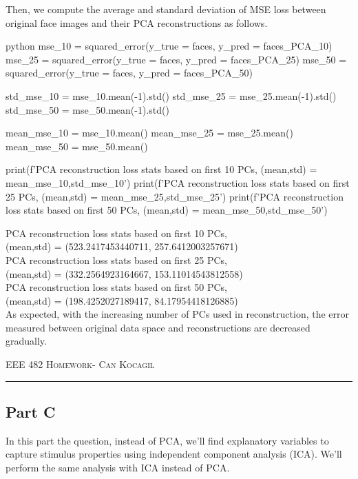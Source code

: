 \documentclass[12pt]{amsart}
\begin{document}
Then, we compute the average and standard deviation of  MSE loss between original face images and their PCA reconstructions as follows.

\begin{mintedbox}{python}
mse_10 = squared_error(y_true = faces, y_pred = faces_PCA_10)
mse_25 = squared_error(y_true = faces, y_pred = faces_PCA_25)
mse_50 = squared_error(y_true = faces, y_pred = faces_PCA_50)


std_mse_10 = mse_10.mean(-1).std()
std_mse_25 = mse_25.mean(-1).std()
std_mse_50 = mse_50.mean(-1).std()

mean_mse_10 = mse_10.mean()
mean_mse_25 = mse_25.mean()
mean_mse_50 = mse_50.mean()


print(f'PCA reconstruction loss stats based on first 10 PCs, \n (mean,std) = {mean_mse_10,std_mse_10}')
print(f'PCA reconstruction loss stats based on first 25 PCs, \n (mean,std) = {mean_mse_25,std_mse_25}')
print(f'PCA reconstruction loss stats based on first 50 PCs, \n (mean,std) = {mean_mse_50,std_mse_50}')
\end{mintedbox}

PCA reconstruction loss stats based on first 10 PCs,  \\
 (mean,std) = (523.2417453440711, 257.6412003257671)\\
PCA reconstruction loss stats based on first 25 PCs, \\
 (mean,std) = (332.2564923164667, 153.11014543812558)\\
PCA reconstruction loss stats based on first 50 PCs, \\
 (mean,std) = (198.4252027189417, 84.17954418126885)\\

As expected, with the increasing number of PCs used in reconstruction, the error measured between original data space and reconstructions are decreased gradually.


\newpage
{\scshape EEE 482} \hfill {\scshape \large  Homework-\relax} \hfill {\scshape Can Kocagil}
\smallskip
\hrule
\vspace{2mm}


\subsection{Part C}
In this part the question, instead of PCA, we'll find explanatory variables to capture stimulus properties using independent component analysis (ICA). We'll perform the same analysis with ICA instead of PCA.
\end{document}
